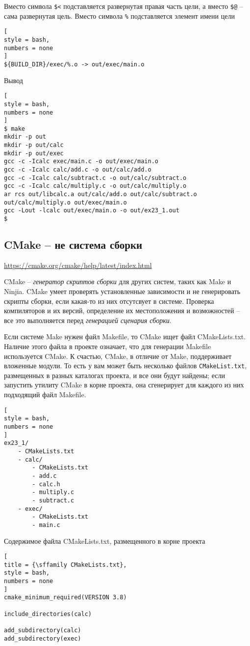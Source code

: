 \documentclass[%
	11pt,
	a4paper,
	utf8,
		]{article}
\begin{document}
Вместо символа \verb|$<| подставляется развернутая правая часть цели, а вместо \verb|$@| -- сама развернутая цель. Вместо символа \verb|%| подставляется элемент имени цели
\begin{lstlisting}[
style = bash,
numbers = none
]
${BUILD_DIR}/exec/%.o -> out/exec/main.o
\end{lstlisting}

Вывод
\begin{lstlisting}[
style = bash,
numbers = none
]
$ make
mkdir -p out
mkdir -p out/calc
mkdir -p out/exec
gcc -c -Icalc exec/main.c -o out/exec/main.o
gcc -c -Icalc calc/add.c -o out/calc/add.o
gcc -c -Icalc calc/subtract.c -o out/calc/subtract.o
gcc -c -Icalc calc/multiply.c -o out/calc/multiply.o
ar rcs out/libcalc.a out/calc/add.o out/calc/subtract.o out/calc/multiply.o out/exec/main.o
gcc -Lout -lcalc out/exec/main.o -o out/ex23_1.out
$
\end{lstlisting}

\subsection{CMake -- не система сборки}

\url{https://cmake.org/cmake/help/latest/index.html}

CMake -- \emph{генератор скриптов сборки} для других систем, таких как Make и Ninjia. CMake умеет проверять установленные зависимости и не генерировать скрипты сборки, если какая-то из них отсутсвует в системе. Проверка компиляторов и их версий, определение их местоположения и возможностей -- все это выполняется перед \emph{генерацией сценария сборки}.

Если системе Make нужен файл Makefile, то CMake ищет файл CMakeLists.txt. Наличие этого файла в проекте означает, что для генерации Makefile используется CMake. К счастью, CMake, в отличие от Make, поддерживает вложенные модули. То есть у вам может быть несколько файлов \verb|CMakeList.txt|, размещенных в разных каталогах проекта, и все они будут найдены; если запустить утилиту CMake в корне проекта, она сгенерирует для каждого из них подходящий файл Makefile.
\begin{lstlisting}[
style = bash,
numbers = none
]
ex23_1/
	- CMakeLists.txt
	- calc/
	    - CMakeLists.txt
		- add.c
		- calc.h
		- multiply.c
		- subtract.c
	- exec/
	    - CMakeLists.txt
		- main.c
\end{lstlisting}

Содержимое файла CMakeLists.txt, размещенного в корне проекта
\begin{lstlisting}[
title = {\sffamily CMakeLists.txt},
style = bash,
numbers = none
]
cmake_minimum_required(VERSION 3.8)

include_directories(calc)

add_subdirectory(calc)
add_subdirectory(exec)
\end{lstlisting}
\end{document}
